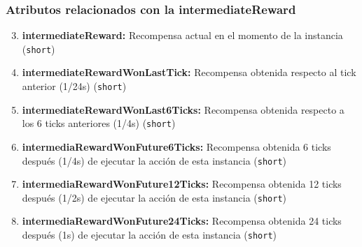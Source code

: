 \documentclass[10pt, spanish, pdftex]{../.template/template}
\begin{document}
    \subsubsection{Atributos relacionados con la intermediateReward}
    \begin{enumerate}
        \setcounter{enumi}{2}
        \item \textbf{intermediateReward:} Recompensa actual en el momento de la instancia (\texttt{short})
        \item \textbf{intermediateRewardWonLastTick:} Recompensa obtenida respecto al tick anterior (1/24s) (\texttt{short})
        \item \textbf{intermediateRewardWonLast6Ticks:} Recompensa obtenida respecto a los 6 ticks anteriores (1/4s) (\texttt{short})
        \item \textbf{intermediaRewardWonFuture6Ticks:} Recompensa obtenida 6 ticks después (1/4s) de ejecutar la acción de esta instancia (\texttt{short})
        \item \textbf{intermediaRewardWonFuture12Ticks:} Recompensa obtenida 12 ticks después (1/2s) de ejecutar la acción de esta instancia (\texttt{short})
        \item \textbf{intermediaRewardWonFuture24Ticks:} Recompensa obtenida 24 ticks después (1s) de ejecutar la acción de esta instancia (\texttt{short})
    \end{enumerate}
\end{document}
